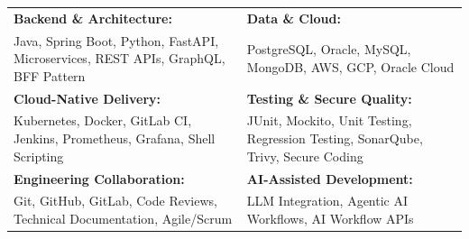 \renewcommand{\arraystretch}{1.2}

\begin{tabular}{p{} p{}}
    \textbf{Backend \& Architecture:} & \textbf{Data \& Cloud:} \\
    Java, Spring Boot, Python, FastAPI, Microservices, REST APIs, GraphQL, BFF Pattern & PostgreSQL, Oracle, MySQL, MongoDB, AWS, GCP, Oracle Cloud \\

    \textbf{Cloud-Native Delivery:} & \textbf{Testing \& Secure Quality:} \\
    Kubernetes, Docker, GitLab CI, Jenkins, Prometheus, Grafana, Shell Scripting & JUnit, Mockito, Unit Testing, Regression Testing, SonarQube, Trivy, Secure Coding \\

    \textbf{Engineering Collaboration:} & \textbf{AI-Assisted Development:} \\
    Git, GitHub, GitLab, Code Reviews, Technical Documentation, Agile/Scrum & LLM Integration, Agentic AI Workflows, AI Workflow APIs \\
\end{tabular}
